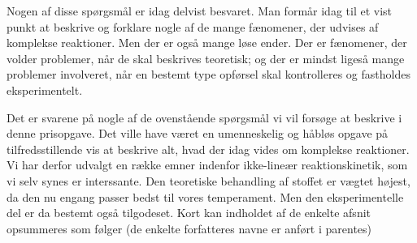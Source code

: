 \newpage
Nogen af disse sp{\o}rgsm{\aa}l er idag delvist besvaret.
Man form{\aa}r idag til et vist punkt at beskrive og
forklare nogle af de mange f{\ae}nomener, der udvises af
komplekse reaktioner. Men der er ogs{\aa} mange l{\o}se
ender. Der er f{\ae}nomener, der volder problemer, n{\aa}r
de skal beskrives teoretisk; og der er mindst liges{\aa}
mange problemer involveret, n{\aa}r en bestemt type
opf{\o}rsel skal kontrolleres og fastholdes eksperimentelt.

\vspace{2.0mm}
Det er svarene p{\aa} nogle af de ovenst{\aa}ende
sp{\o}rgsm{\aa}l vi vil fors{\o}ge at beskrive i denne
prisopgave. Det ville have v{\ae}ret en umenneskelig og
h{\aa}bl{\o}s opgave p{\aa} tilfredsstillende vis at
beskrive alt, hvad der idag vides om komplekse reaktioner.
Vi har derfor udvalgt en r{\ae}kke emner indenfor
ikke-line{\ae}r reaktionskinetik, som vi selv synes er
interssante. Den teoretiske behandling af stoffet er
v{\ae}gtet h{\o}jest, da den nu engang passer bedst til
vores temperament. Men den eksperimentelle del er da
bestemt ogs{\aa} tilgodeset. Kort kan indholdet af de
enkelte afsnit opsummeres som f{\o}lger (de enkelte forfatteres
navne er anf{\o}rt i parentes)

